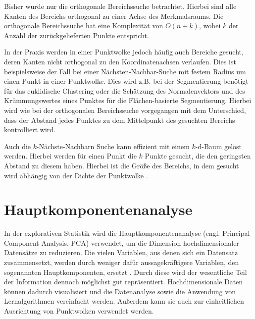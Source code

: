 Bisher wurde nur die orthogonale Bereichssuche betrachtet. Hierbei sind alle Kanten des Bereichs orthogonal zu einer Achse des Merkmalsraums. Die  orthogonale Be\-reichs\-su\-che hat eine Komplexität von $ O(n+k) $, wobei $ k $ der Anzahl der zurückgelieferten Punkte entspricht. 

In der Praxis werden in einer Punktwolke jedoch häufig auch Bereiche gesucht, deren Kanten nicht orthogonal zu den Koordinatenachsen verlaufen.  Dies ist bei\-spiels\-wei\-se der Fall bei einer Nächsten-Nachbar-Suche mit festem Radius um einen Punkt in einer Punktwolke. Dies wird z.B. bei der Segmentierung benötigt für das euklidische Clustering oder die Schätzung des Normalenvektors und des Krümmungswertes eines Punktes für die Flächen-basierte Segmentierung. Hierbei wird wie bei der orthogonalen Bereichssuche vorgegangen mit dem Unterschied, dass der Abstand jedes Punktes zu dem Mittelpunkt des gesuchten Bereichs kontrolliert wird. 

Auch die $k$-Nächste-Nachbarn Suche kann effizient mit einem $k$-d-Baum gelöst werden. Hierbei werden für einen Punkt die $k$ Punkte gesucht, die den geringsten Abstand zu diesem haben. Hierbei ist die Größe des Bereichs, in dem gesucht wird abhängig von der Dichte der Punktwolke \cite{Rabbani2006}. 

\section[Hauptkomponentenanalyse (Schmelzer)]{Hauptkomponentenanalyse}

In der explorativen Statistik wird die Hauptkomponentenanalyse (engl. Principal Component Analysis, PCA) verwendet, um die Dimension hochdimensionaler Datensätze zu reduzieren. Die vielen Variablen, aus denen sich ein Datensatz zu\-sam\-men\-setzt, werden durch weniger dafür aussagekräftigere Variablen, den sogenannten Hauptkomponenten, ersetzt \cite{Vogel2013}. Durch diese wird der wesentliche Teil der Information dennoch möglichst gut repräsentiert. Hochdimensionale Daten können dadurch visualisiert und die Datenanalyse sowie die Anwendung von Lernalgorithmen vereinfacht werden. Außerdem kann sie auch zur einheitlichen Ausrichtung von Punktwolken verwendet werden.

